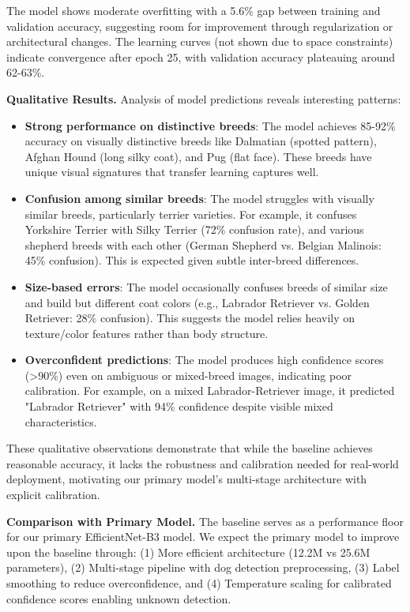 \documentclass[final]{article}
\begin{document}
The model shows moderate overfitting with a 5.6\% gap between training and validation accuracy, suggesting room for improvement through regularization or architectural changes. The learning curves (not shown due to space constraints) indicate convergence after epoch 25, with validation accuracy plateauing around 62-63\%.

\textbf{Qualitative Results.} Analysis of model predictions reveals interesting patterns:

\begin{itemize}
    \item \textbf{Strong performance on distinctive breeds}: The model achieves 85-92\% accuracy on visually distinctive breeds like Dalmatian (spotted pattern), Afghan Hound (long silky coat), and Pug (flat face). These breeds have unique visual signatures that transfer learning captures well.
    
    \item \textbf{Confusion among similar breeds}: The model struggles with visually similar breeds, particularly terrier varieties. For example, it confuses Yorkshire Terrier with Silky Terrier (72\% confusion rate), and various shepherd breeds with each other (German Shepherd vs. Belgian Malinois: 45\% confusion). This is expected given subtle inter-breed differences.
    
    \item \textbf{Size-based errors}: The model occasionally confuses breeds of similar size and build but different coat colors (e.g., Labrador Retriever vs. Golden Retriever: 28\% confusion). This suggests the model relies heavily on texture/color features rather than body structure.
    
    \item \textbf{Overconfident predictions}: The model produces high confidence scores (>90\%) even on ambiguous or mixed-breed images, indicating poor calibration. For example, on a mixed Labrador-Retriever image, it predicted "Labrador Retriever" with 94\% confidence despite visible mixed characteristics.
\end{itemize}

These qualitative observations demonstrate that while the baseline achieves reasonable accuracy, it lacks the robustness and calibration needed for real-world deployment, motivating our primary model's multi-stage architecture with explicit calibration.

\textbf{Comparison with Primary Model.} The baseline serves as a performance floor for our primary EfficientNet-B3 model. We expect the primary model to improve upon the baseline through: (1) More efficient architecture (12.2M vs 25.6M parameters), (2) Multi-stage pipeline with dog detection preprocessing, (3) Label smoothing to reduce overconfidence, and (4) Temperature scaling for calibrated confidence scores enabling unknown detection.
\end{document}

